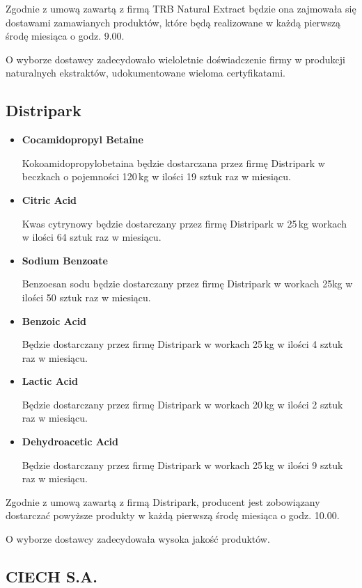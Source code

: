 	Zgodnie z umową zawartą z firmą \textsf{TRB Natural Extract} będzie ona zajmowała się dostawami zamawianych produktów, które będą realizowane w każdą pierwszą środę miesiąca o godz. 9.00.

	O wyborze dostawcy zadecydowało wieloletnie doświadczenie firmy w produkcji naturalnych ekstraktów, udokumentowane wieloma certyfikatami.



\subsection{\textsf{Distripark}}

\begin{itemize}
	\item \textbf{Cocamidopropyl Betaine}

	Kokoamidopropylobetaina będzie dostarczana przez firmę \textsf{Distripark} w beczkach o pojemności 120\,kg w ilości 19 sztuk raz w miesiącu.
	\item \textbf{Citric Acid}

	Kwas cytrynowy będzie dostarczany przez firmę \textsf{Distripark} w 25\,kg workach w ilości 64 sztuk raz w miesiącu.
	\item \textbf{Sodium Benzoate}

	Benzoesan sodu będzie dostarczany przez firmę \textsf{Distripark} w workach 25kg w ilości 50 sztuk raz w miesiącu.
	\item \textbf{Benzoic Acid}

	Będzie dostarczany przez firmę \textsf{Distripark} w workach 25\,kg w ilości 4 sztuk raz w miesiącu.
	\item \textbf{Lactic Acid}

	Będzie dostarczany przez firmę \textsf{Distripark} w workach 20\,kg w ilości 2 sztuk raz w miesiącu.
	\item \textbf{Dehydroacetic Acid }

	Będzie dostarczany przez firmę \textsf{Distripark} w workach 25\,kg w ilości 9 sztuk raz w miesiącu.
\end{itemize}\vspace{\baselineskip}

	Zgodnie z umową zawartą z firmą \textsf{Distripark}, producent jest zobowiązany dostarczać powyższe produkty w każdą pierwszą środę miesiąca o godz. 10.00.

	O wyborze dostawcy zadecydowała wysoka jakość produktów.

\subsection{\textsf{CIECH S.A.}}

